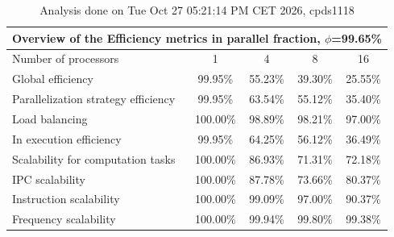 \begin{table}[h]
\begin{center}
\begin{tabular}{|l|c|c|c|c|}
\hline
\multicolumn{5}{|c|}{Overview of the Efficiency metrics in parallel fraction, $\phi$=99.65\%} \\
\hline
\hline
Number of processors & 1 & 4 & 8 & 16 \\
\hline
\hline
Global efficiency                      &     99.95\% &     55.23\% &     39.30\% &     25.55\% \\
\hline
\hline
Parallelization strategy efficiency &     99.95\% &     63.54\% &     55.12\% &     35.40\% \\
\hline
Load balancing                   &    100.00\% &     98.89\% &     98.21\% &     97.00\% \\
In execution efficiency          &     99.95\% &     64.25\% &     56.12\% &     36.49\% \\
\hline
\hline
Scalability for computation tasks   &    100.00\% &     86.93\% &     71.31\% &     72.18\% \\
\hline
IPC scalability                  &    100.00\% &     87.78\% &     73.66\% &     80.37\% \\
Instruction scalability          &    100.00\% &     99.09\% &     97.00\% &     90.37\% \\
Frequency scalability            &    100.00\% &     99.94\% &     99.80\% &     99.38\% \\
\hline
\end{tabular}
\end{center}
\caption{ Analysis done on Tue Oct 27 05:21:14 PM CET 2026, cpds1118}
\end{table}

